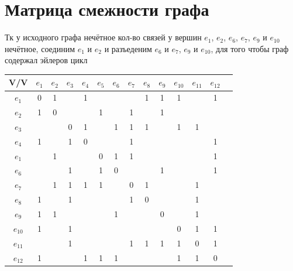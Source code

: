 \documentclass[12pt,a4paper]{report}
\begin{document}
\section*{Матрица смежности графа}
Тк у исходного графа нечётное кол-во связей у вершин $e_1$, $e_2$, $e_6$, $e_7$, $e_9$ и $e_{10}$ нечётное, соединим $e_1$ и $e_2$ и разъеденим $e_6$ и $e_7$, $e_9$ и $e_{10}$, для того чтобы граф содержал эйлеров цикл \\
\hfill\break
\begin{tabular}{|c|c|c|c|c|c|c|c|c|c|c|c|c|c|}
    \hline
    V/V & $e_{1}$ & $e_{2}$ & $e_{3}$ & $e_{4}$ & $e_{5}$ & $e_{6}$ & $e_{7}$ & $e_{8}$ & $e_{9}$ & $e_{10}$ & $e_{11}$ & $e_{12}$ \\
    \hline
    $e_{1}$  & 0 & 1 &   & 1 &   &   &   & 1 & 1 & 1 &   & 1 \\
    \hline
    $e_{2}$  & 1 & 0 &   &   & 1 &   & 1 &   & 1 &   &   &   \\
    \hline
    $e_{3}$  &   &   & 0 & 1 &   & 1 & 1 & 1 &   & 1 & 1 &   \\
    \hline
    $e_{4}$  & 1 &   & 1 & 0 &   &   & 1 &   &   &   &   & 1 \\
    \hline
    $e_{1}$  &   & 1 &   &   & 0 & 1 & 1 &   &   &   &   & 1 \\
    \hline
    $e_{6}$  &   &   & 1 &   & 1 & 0 &   &   & 1 &   &   & 1 \\
    \hline
    $e_{7}$  &   & 1 & 1 & 1 & 1 &   & 0 & 1 &   &   & 1 &   \\
    \hline
    $e_{8}$  & 1 &   & 1 &   &   &   & 1 & 0 &   &   & 1 &   \\
    \hline
    $e_{9}$  & 1 & 1 &   &   &   & 1 &   &   & 0 &   & 1 &   \\
    \hline
    $e_{10}$ & 1 &   & 1 &   &   &   &   &   &   & 0 & 1 & 1 \\
    \hline
    $e_{11}$ &   &   & 1 &   &   &   & 1 & 1 & 1 & 1 & 0 & 1 \\
    \hline
    $e_{12}$ & 1 &   &   & 1 & 1 & 1 &   &   &   & 1 & 1 & 0 \\
    \hline
\end{tabular}
\end{document}
